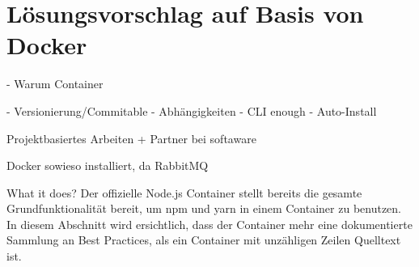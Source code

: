 \chapter{Lösungsvorschlag auf Basis von Docker}
\label{cha:concept}



- Warum Container


- Versionierung/Commitable
- Abhängigkeiten
- CLI enough
- Auto-Install


Projektbasiertes Arbeiten + Partner bei softaware

Docker sowieso installiert, da RabbitMQ



What it does?
Der offizielle Node.js Container stellt bereits die gesamte Grundfunktionalität bereit, um npm und yarn in einem Container zu benutzen.
In diesem Abschnitt wird ersichtlich, dass der Container mehr eine dokumentierte Sammlung an Best Practices, als ein Container mit unzähligen Zeilen Quelltext ist.
